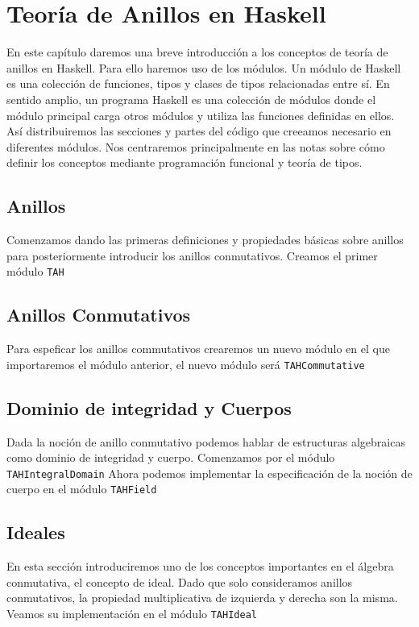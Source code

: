 \chapter{Teoría de Anillos en Haskell}
En este capítulo daremos una breve introducción a los conceptos de teoría de anillos en Haskell. Para ello haremos uso de los módulos. Un módulo de Haskell es una colección de funciones, tipos y clases de tipos relacionadas entre sí. En sentido amplio, un programa Haskell es una colección de módulos donde el módulo principal carga otros módulos y utiliza las funciones definidas en ellos. Así distribuiremos las secciones y partes del código que creeamos necesario en diferentes módulos. Nos centraremos principalmente en las notas sobre cómo definir los conceptos mediante programación funcional y teoría de tipos.

\section{Anillos}
Comenzamos dando las primeras definiciones y propiedades básicas sobre anillos para posteriormente introducir los anillos conmutativos. Creamos el primer módulo \texttt{TAH}

\section{Anillos Conmutativos}
Para espeficar los anillos commutativos crearemos un nuevo módulo en el que importaremos el módulo anterior, el nuevo módulo será \texttt{TAHCommutative}
\section{Dominio de integridad y Cuerpos}
Dada la noción de anillo conmutativo podemos hablar de estructuras algebraicas como dominio de integridad y cuerpo. Comenzamos por el módulo \texttt{TAHIntegralDomain} Ahora podemos implementar la especificación de la noción de cuerpo en el módulo \texttt{TAHField}

\section{Ideales}
En esta sección introduciremos uno de los conceptos importantes en el álgebra conmutativa, el concepto de ideal. Dado que solo consideramos anillos conmutativos, la propiedad multiplicativa de izquierda y derecha son la misma. Veamos su implementación en el módulo \texttt{TAHIdeal}


